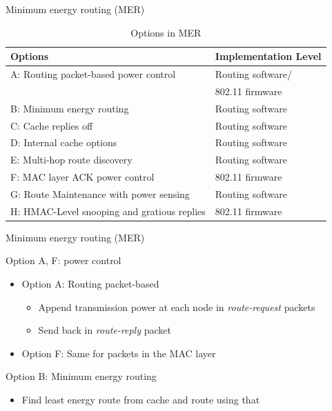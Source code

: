 \documentclass{beamer}
\begin{document}
\begin{frame}{Minimum energy routing (MER)}

\begin{table}[b]
  \begin{tabular}{ll}
    Options & Implementation Level  \\
    \hline
    A: Routing packet-based power control & Routing software/\\ &802.11 firmware \\
    B: Minimum energy routing & Routing software \\
    C: Cache replies off & Routing software \\
    D: Internal cache options & Routing software \\
    E: Multi-hop route discovery & Routing software \\
    F: MAC layer ACK power control & 802.11 firmware \\
    G: Route Maintenance with power sensing & Routing software \\
    H: HMAC-Level snooping and gratious replies & 802.11 firmware \\
  \end{tabular}
  \caption{Options in MER\cite{doshi2002demand}}
  \label{tbl:mer-options}
\end{table}
\end{frame}

\begin{frame}{Minimum energy routing (MER)}
\begin{block}{Option A, F: power control}
    \begin{itemize}
    \item Option A: Routing packet-based
    \begin{itemize}
        \item Append transmission power at each node in \textit{route-request} packets
        \item Send back in \textit{route-reply} packet
    \end{itemize}
    \item Option F: Same for packets in the MAC layer
    \end{itemize}
\end{block}
\begin{block}{Option B: Minimum energy routing}
    \begin{itemize}
        \item Find least energy route from cache and route using that
    \end{itemize}
\end{block}
\end{frame}
\end{document}
